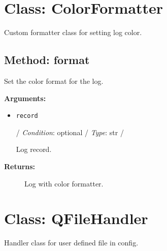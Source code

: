 %
%

\hypertarget{qconnectbase-qlogger-class-colorformatter-43}{%
\section{Class: ColorFormatter}\label{qconnectbase-qlogger-class-colorformatter-43}}

\begin{Shaded}
\begin{Highlighting}[]
\end{Highlighting}
\end{Shaded}

Custom formatter class for setting log color.

\hypertarget{qconnectbase-qlogger-method-format-44}{%
\subsection{Method: format}\label{qconnectbase-qlogger-method-format-44}}

Set the color format for the log.

\textbf{Arguments:}

\begin{itemize}
\item
  \texttt{record}

  / \emph{Condition}: optional / \emph{Type}: str /

  Log record.
\end{itemize}

\begin{description}
\item[\textbf{Returns:}]
Log with color formatter.
\end{description}

\hypertarget{qconnectbase-qlogger-class-qfilehandler-45}{%
\section{Class: QFileHandler}\label{qconnectbase-qlogger-class-qfilehandler-45}}

\begin{Shaded}
\begin{Highlighting}[]
\end{Highlighting}
\end{Shaded}

Handler class for user defined file in config.

